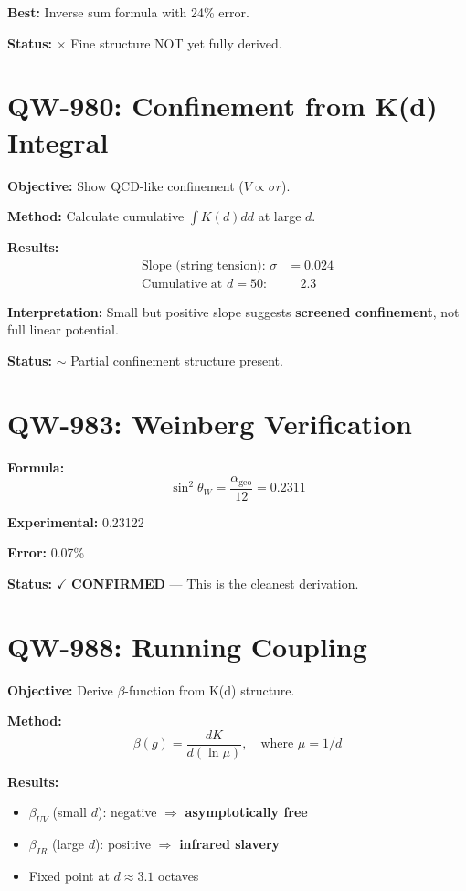 \documentclass[11pt, a4paper]{article}
\theoremstyle{remark}
\newcommand{\alphageo}{\alpha_{\text{geo}}}
\begin{document}
\textbf{Best:} Inverse sum formula with 24\% error.

\textbf{Status:} $\times$ Fine structure NOT yet fully derived.

\section{QW-980: Confinement from K(d) Integral}

\textbf{Objective:} Show QCD-like confinement ($V \propto \sigma r$).

\textbf{Method:} Calculate cumulative $\int K(d) dd$ at large $d$.

\textbf{Results:}
\begin{align}
\text{Slope (string tension): } \sigma &= 0.024 \\
\text{Cumulative at } d=50: & \quad 2.3
\end{align}

\textbf{Interpretation:} Small but positive slope suggests \textbf{screened confinement}, not full linear potential.

\textbf{Status:} $\sim$ Partial confinement structure present.

\section{QW-983: Weinberg Verification}

\textbf{Formula:}
\begin{equation}
\sin^2\theta_W = \frac{\alphageo}{12} = 0.2311
\end{equation}

\textbf{Experimental:} 0.23122

\textbf{Error:} 0.07\%

\textbf{Status:} $\checkmark$ \textbf{CONFIRMED} --- This is the cleanest derivation.

\section{QW-988: Running Coupling}

\textbf{Objective:} Derive $\beta$-function from K(d) structure.

\textbf{Method:}
\begin{equation}
\beta(g) = \frac{dK}{d(\ln\mu)}, \quad \text{where } \mu = 1/d
\end{equation}

\textbf{Results:}
\begin{itemize}
    \item $\beta_{UV}$ (small $d$): negative $\Rightarrow$ \textbf{asymptotically free}
    \item $\beta_{IR}$ (large $d$): positive $\Rightarrow$ \textbf{infrared slavery}
    \item Fixed point at $d \approx 3.1$ octaves
\end{itemize}
\end{document}
